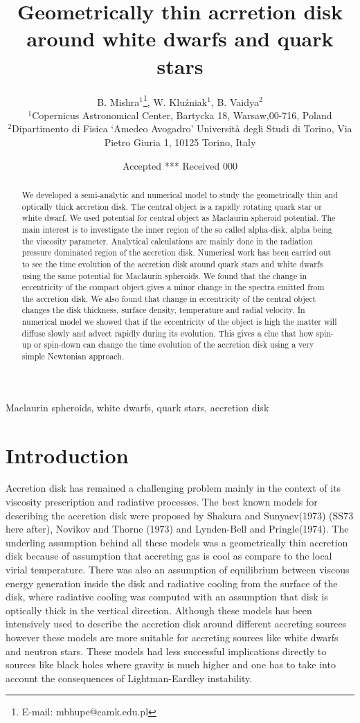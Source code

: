 \documentclass[useAMS,usenatbib]{mn2e}
\title[Geometrically thin acrretion disk around white dwarfs and quark stars]{Geometrically thin acrretion disk around white dwarfs and quark stars}
\author[B. Mishra, W. Klu\'zniak and B. Vaidya]{B. Mishra$^{1}$\thanks{E-mail:
mbhupe@camk.edu.pl}, W. Klu\'zniak$^{1}$, B. Vaidya$^{2}$\\
$^{1}$Copernicus Astronomical Center, Bartycka 18, Warsaw,00-716, Poland\\
$^{2}$Dipartimento di Fisica `Amedeo Avogadro' Università degli Studi di Torino, Via Pietro Giuria 1, 10125 Torino, Italy}
\begin{document}
\date{Accepted *** Received 000}
\pagerange{\pageref{firstpage}--\pageref{lastpage}} 
\maketitle
\label{firstpage}
\begin{abstract}
We developed a semi-analytic and numerical model to study the geometrically thin and optically thick accretion disk. The central object is a rapidly rotating quark star or white dwarf. We used potential for central object as Maclaurin spheroid potential. The main interest is to investigate the inner region of the so called alpha-disk, alpha being the viscosity parameter. Analytical calculations are mainly done in the radiation pressure dominated region of the accretion disk. Numerical work has been carried out to see the time evolution of the accretion disk around quark stars and white dwarfs using the same potential for Maclaurin spheroids. We found that the change in eccentricity of the compact object gives a minor change in the spectra emitted from the accretion disk. We also found that change in eccentricity of the central object changes the disk thickness, surface density, temperature and radial velocity. In numerical model we showed that if the eccentricity of the object is high the matter will diffuse slowly and advect rapidly during its evolution. This gives a clue that how spin-up or spin-down can change the time evolution of the accretion disk using a very simple Newtonian approach.  
\end{abstract}
\begin{keywords}
Maclaurin spheroids, white dwarfs, quark stars, accretion disk
\end{keywords}
\section{Introduction}
Accretion disk has remained a challenging problem mainly in the context of its viscosity prescription and radiative processes. The best known models for describing the accretion disk were proposed by Shakura and Sunyaev(1973) (SS73 here after), Novikov and Thorne (1973) and Lynden-Bell and Pringle(1974). The underling assumption behind all these models was a geometrically thin accretion disk because of assumption that accreting gas is cool as compare to the local virial temperature. There was also an assumption of equilibrium between viscous energy generation inside the disk and radiative cooling from the surface of the disk, where radiative cooling was computed with an assumption that disk is optically thick in the vertical direction. Although these models has been intensively used to describe the accretion disk around different accreting sources however these models are more suitable for accreting sources like white dwarfs and neutron stars. These models had less successful implications directly to sources like black holes where gravity is much higher and one has to take into account the consequences of Lightman-Eardley instability. 
\end{document}
